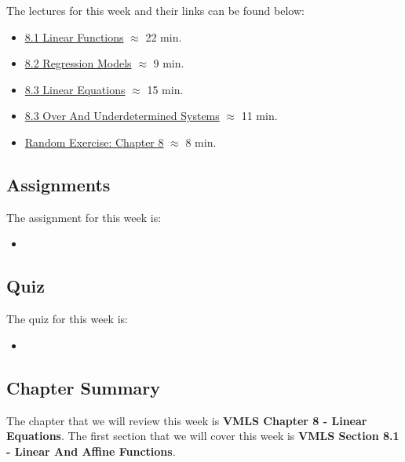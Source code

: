 The lectures for this week and their links can be found below:

\begin{itemize}
    \item \href{https://applied.cs.colorado.edu/mod/hvp/view.php?id=50757}{8.1 Linear Functions} $\approx$ 22 min.
    \item \href{https://applied.cs.colorado.edu/mod/hvp/view.php?id=50758}{8.2 Regression Models} $\approx$ 9 min.
    \item \href{https://applied.cs.colorado.edu/mod/hvp/view.php?id=50759}{8.3 Linear Equations} $\approx$ 15 min.
    \item \href{https://applied.cs.colorado.edu/mod/hvp/view.php?id=50760}{8.3 Over And Underdetermined Systems} $\approx$ 11 min.
    \item \href{https://applied.cs.colorado.edu/mod/hvp/view.php?id=50761}{Random Exercise: Chapter 8} $\approx$ 8 min.
\end{itemize}

\subsection{Assignments}

The assignment for this week is:

\begin{itemize}
    \item {}
\end{itemize}

\subsection{Quiz}

The quiz for this week is:

\begin{itemize}
    \item {}
\end{itemize}

\subsection{Chapter Summary}

The chapter that we will review this week is \textbf{VMLS Chapter 8 - Linear Equations}. The first section that we will cover this week is \textbf{VMLS Section 8.1 - Linear And Affine Functions}.

